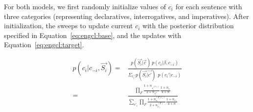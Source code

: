 For both models, we first randomly initialize values of $c_{i}$ for each sentence with three categories (representing declaratives, interrogatives, and imperatives). After initialization, the \dlearnerabbr{} sweeps to update current $c_{i}$ with the posterior distribution specified in Equation~\ref{eq:engcl:base}, and the \plearnerabbr{} updates with Equation~\ref{eq:engcl:target}.  

\begin{equation} \label{eq:engcl:base}
\begin{split}
p(c_{i}| c_{-i}, \vec{S_{i}}) = &\frac{p(\vec{S_{i}}| \vec{c})\ p(c_{i}|\beta, c_{-i})}{\Sigma_{c_{i}'}p(\vec{S_{i}}| \vec{c'})\ \ p(c_{i}'| c_{-i})}\\
= & \frac{ \prod_{F}\frac{1+n_{s^{(F, c_{i})}_{i}}}{2+n_{c^{F}_{i}}}%
\frac{1+n_{c_{i}}}{4+n}%
}%
{\sum_{c'_{i}}\prod_{F}\frac{1+n^{(F, c'_{i})}_{s_{i}}}{2+n^{(F)}_{c'_{i}}}%
\frac{1+n_{c'_{i}}}{4+n} %
}%
\end{split}
\end{equation}

